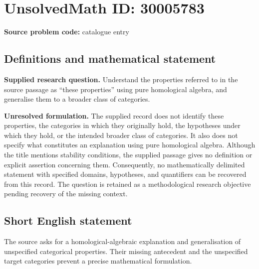 \documentclass[11pt]{article}
\begin{document}
\section*{UnsolvedMath ID: 30005783}
\textbf{Source problem code:} catalogue entry
\subsection{Definitions and mathematical statement}
\textbf{Supplied research question.} Understand the properties referred to in the source passage as ``these properties'' using pure homological algebra, and generalise them to a broader class of categories.

\textbf{Unresolved formulation.} The supplied record does not identify these properties, the categories in which they originally hold, the hypotheses under which they hold, or the intended broader class of categories. It also does not specify what constitutes an explanation using pure homological algebra. Although the title mentions stability conditions, the supplied passage gives no definition or explicit assertion concerning them. Consequently, no mathematically delimited statement with specified domains, hypotheses, and quantifiers can be recovered from this record. The question is retained as a methodological research objective pending recovery of the missing context.
\subsection{Short English statement}
The source asks for a homological-algebraic explanation and generalisation of unspecified categorical properties. Their missing antecedent and the unspecified target categories prevent a precise mathematical formulation.
\end{document}
